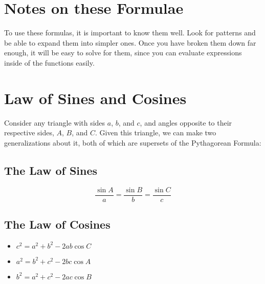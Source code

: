 \section{Notes on these Formulae}
To use these formulas, it is important to know them well.  Look for patterns and
be able to expand them into simpler ones.  Once you have broken them down far
enough, it will be easy to solve for them, since you can evaluate expressions
inside of the functions easily.

\section{Law of Sines and Cosines}
Consider any triangle with sides $a$, $b$, and $c$, and angles opposite to their
respective sides, $A$, $B$, and $C$.  Given this triangle, we can make two
generalizations about it, both of which are supersets of the Pythagorean
Formula:

\subsection{The Law of Sines}
\begin{equation}
  \frac{\sin A}{a}=\frac{\sin B}{b}=\frac{\sin C}{c}
\end{equation}

\subsection{The Law of Cosines}
\begin{itemize}
  \item{$c^2=a^2+b^2-2ab\cos C$}
  \item{$a^2=b^2+c^2-2bc\cos A$}
  \item{$b^2=a^2+c^2-2ac\cos B$}
\end{itemize}
